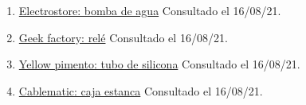 \documentclass[12pt]{article}
\begin{document}
\begin{enumerate}
				\item 
				\label{bib: electrostore}
				\href{https://grupoelectrostore.com/shop/motores/bombas-para-agua/mini-bomba-de-agua-sumergible-5v/}{Electrostore: bomba de agua} Consultado el 16/08/21.
				
				
				\item 
				\label{bib: geek factory}
				\href{https://www.geekfactory.mx/tienda/componentes-electronicos/relevadores/relevador-5-volts-srd-05vdc-sl-c/}{Geek factory: relé} Consultado el 16/08/21.
				
				\item 
				\label{bib: yellow pimento}
				\href{https://yellowpimento.com/Para-compresores-de-aire/vdvgx-504009/12mm-OD-ft-m-Tubo-flexible-de-caucho-de-silicona-Tubo-de-manguera-de.htm}{Yellow pimento: tubo de silicona} Consultado el 16/08/21.
				
				\item 
				\label{bib: cablematic}
				\href{https://cablematic.com/es/productos/caja-estanca-de-superficie-rectangular-ip55-200-x-155-x-80-mm-AE006/}{Cablematic: caja estanca} Consultado el 16/08/21.
				
			
				
				
				
		
			\end{enumerate}
\end{document}
